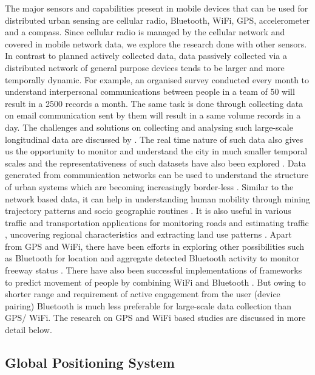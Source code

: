 The major sensors and capabilities present in mobile devices that can be used for distributed urban sensing are cellular radio, Bluetooth, WiFi, GPS, accelerometer and a compass.
Since cellular radio is managed by the cellular network and covered in mobile network data, we explore the research done with other sensors.
In contrast to planned actively collected data, data passively collected via a distributed network of general purpose devices tends to be larger and more temporally dynamic.
For example, an organised survey conducted every month to understand interpersonal communications between people in a team of 50 will result in a 2500 records a month.
The same task is done through collecting data on email communication sent by them will result in a same volume records in a day.
The challenges and solutions on collecting and analysing such large-scale longitudinal data are discussed by \citep{laurila2012, antonic2013}.
The real time nature of such data also gives us the opportunity to monitor and understand the city in much smaller temporal scales \citep{townsend2000, oneill2006} and the representativeness of such datasets have also been explored \citep{shin2013, kobus2013}.
Data generated from communication networks can be used to understand the structure of urban systems which are becoming increasingly border-less \cite{bertolini2003}.
Similar to the network based data, it can help in understanding human mobility \citep{asgari2013, amini2014, zhang2014} through mining trajectory patterns \citep{giannotti2007} and socio geographic routines \citep{farrahi2010}.
It is also useful in various traffic and transportation applications for monitoring roads \citep{mohan2008} and estimating traffic \citep{cheng2006}, uncovering regional characteristics \citep{chi2014} and extracting land use patterns \citep{shimosaka2014}.
Apart from GPS and WiFi, there have been efforts in exploring other possibilities such as Bluetooth for location \citep{bandara2004} and aggregate detected Bluetooth activity to monitor freeway status \citep{haghani2010}.
There have also been successful implementations of frameworks to predict movement of people by combining WiFi and Bluetooth \citep{vu2011}.
But owing to shorter range and requirement of active engagement from the user (device pairing) Bluetooth is much less preferable for large-scale data collection than GPS/ WiFi.
The research on GPS and WiFi based studies are discussed in more detail below.

\subsection{Global Positioning System}

